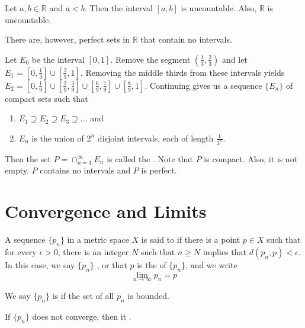 \documentclass{mathnotes}
\newcommand{\rr}{\mathbb{R}}
\begin{document}
\begin{prop}
  Let $a,b\in\rr$ and $a<b$. Then the interval $[a,b]$ is uncountable. Also,
  $\rr$ is uncountable.
\end{prop}

\begin{note}
  There are, however, perfect sets in $\rr$ that contain no intervals.
\end{note}

\begin{ex}
  Let $E_0$ be the interval $[0,1]$. Remove the segment
  $(\frac{1}{3},\frac{2}{3})$ and let $E_1=[0,\frac{1}{3}]
  \cup[\frac{2}{3},1]$. Removing the middle thirds from these intervals yields
  $E_2=[0,\frac{1}{9}] \cup[\frac{2}{9},\frac{3}{9}]
  \cup[\frac{6}{9},\frac{7}{9}] \cup[\frac{8}{9},1]$. Continuing gives us a
  sequence $\{E_n\}$ of compact sets such that
  \begin{enumerate}
    \item $E_1\supseteq E_2\supseteq E_3\supseteq\ldots$ and
    \item $E_n$ is the union of $2^n$ disjoint intervals, each of length
      $\frac{1}{3^n}$.
  \end{enumerate}
  Then the set $P=\cap_{n=1}^\infty E_n$ is called the .
  Note that $P$ is compact. Also, it is not empty. $P$ contains no intervals
  and $P$ is perfect.
\end{ex}

\section*{Convergence and Limits}

\begin{bdefi}
  A sequence $\{p_n\}$ in a metric space $X$ is said to  if
  there is a point $p\in X$ such that for every $\epsilon>0$, there is an
  integer $N$ such that $n\ge N$ implies that $d(p_n,p)<\epsilon$. In this
  case, we say $\{p_n\}$ , or that $p$ is the
   of $\{p_n\}$, and we write
  $$\lim_{n\to\infty}p_n=p$$
\end{bdefi}

\begin{defi}
  We say $\{p_n\}$ is  if the set of all $p_n$ is bounded.
\end{defi}

\begin{defi}
  If $\{p_n\}$ does not converge, then it .
\end{defi}
\end{document}
